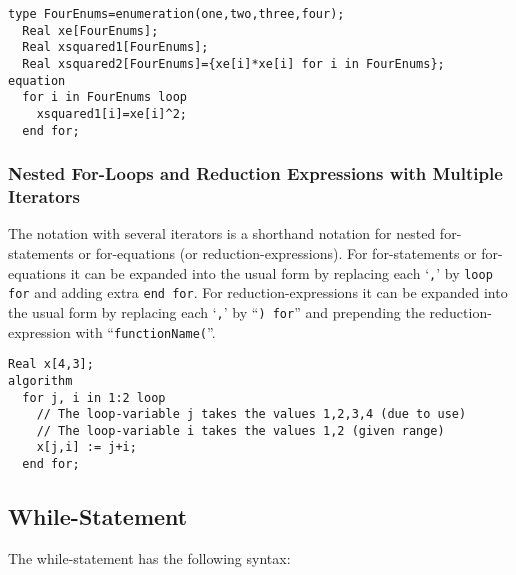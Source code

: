 \begin{example}
\begin{lstlisting}[language=modelica]
  type FourEnums=enumeration(one,two,three,four);
  Real xe[FourEnums];
  Real xsquared1[FourEnums];
  Real xsquared2[FourEnums]={xe[i]*xe[i] for i in FourEnums};
equation
  for i in FourEnums loop
    xsquared1[i]=xe[i]^2;
  end for;
\end{lstlisting}
\end{example}

\subsubsection{Nested For-Loops and Reduction Expressions with Multiple Iterators}

The notation with several iterators is a shorthand notation for nested
for-statements or for-equations (or reduction-expressions). For
for-statements or for-equations it can be expanded into the usual form
by replacing each `\lstinline!,!' by \lstinline!loop for! and adding extra \lstinline!end for!. For
reduction-expressions it can be expanded into the usual form by
replacing each `\lstinline!,!' by ``\lstinline!) for!'' and prepending the reduction-expression
with ``\lstinline!functionName(!''.

\begin{example}
\begin{lstlisting}[language=modelica]
  Real x[4,3];
algorithm
  for j, i in 1:2 loop
    // The loop-variable j takes the values 1,2,3,4 (due to use)
    // The loop-variable i takes the values 1,2 (given range)
    x[j,i] := j+i;
  end for;
\end{lstlisting}
\end{example}

\subsection{While-Statement}

The while-statement has the following syntax:

